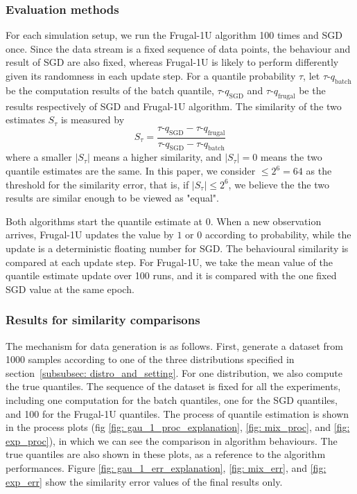 \subsubsection{Evaluation methods}

For each simulation setup, we run the Frugal-1U algorithm 100 times and SGD once. Since the data stream is a fixed sequence of data points, the behaviour and result of SGD are also fixed, whereas Frugal-1U is likely to perform differently given its randomness in each update step. For a quantile probability $\tau$, let $\tau$-$q_{\text{batch}}$ be the computation results of the batch quantile, $\tau$-$q_{\text{SGD}}$ and $\tau$-$q_{\text{frugal}}$ be the results respectively of SGD and Frugal-1U algorithm. The similarity of the two estimates $S_\tau$ is measured by
\begin{equation}
    S_\tau = \frac{ \tau\text{-}q_{\text{SGD}} - \tau\text{-}q_{\text{frugal}} }{ \tau\text{-}q_{\text{SGD}} - \tau\text{-}q_{\text{batch}} }
    \label{eq: frugal_err}
\end{equation}
where a smaller $|S_\tau|$ means a higher similarity, and $|S_\tau| = 0$ means the two quantile estimates are the same. In this paper, we consider $\leq 2^6 = 64$ as the threshold for the similarity error, that is, if $|S_\tau| \leq 2^6$, we believe the the two results are similar enough to be viewed as "equal".

Both algorithms start the quantile estimate at $0$. When a new observation arrives, Frugal-1U updates the value by $1$ or $0$ according to probability, while the update is a deterministic floating number for SGD. The behavioural similarity is compared at each update step. For Frugal-1U, we take the mean value of the quantile estimate update over 100 runs, and it is compared with the one fixed SGD value at the same epoch. 

\subsubsection{Results for similarity comparisons}

The mechanism for data generation is as follows. First, generate a dataset from 1000 samples according to one of the three distributions specified in section~\ref{subsubsec: distro_and_setting}. For one distribution, we also compute the true quantiles. The sequence of the dataset is fixed for all the experiments, including one computation for the batch quantiles, one for the SGD quantiles, and 100 for the Frugal-1U quantiles. The process of quantile estimation is shown in the process plots (fig \ref{fig: gau_1_proc_explanation}, \ref{fig: mix_proc}, and \ref{fig: exp_proc}), in which we can see the comparison in algorithm behaviours. The true quantiles are also shown in these plots, as a reference to the algorithm performances.
Figure \ref{fig: gau_1_err_explanation}, \ref{fig: mix_err}, and \ref{fig: exp_err} show the similarity error values of the final results only.

